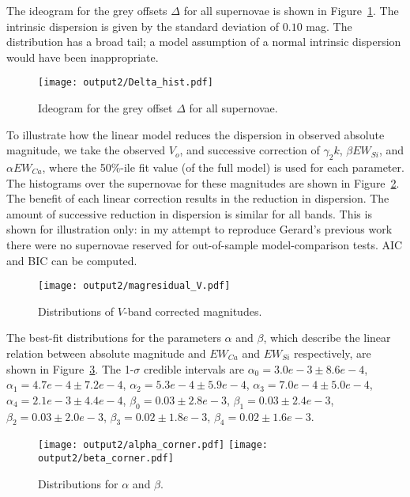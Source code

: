 \documentclass[11pt, oneside]{article}   	%
\begin{document}
The ideogram for the grey offsets $\Delta$ for all supernovae is shown in Figure~\ref{Delta_hist:fig}.  The intrinsic dispersion
is given by the standard deviation of $0.10$ mag.  The distribution has a broad tail; a model assumption of a normal intrinsic dispersion
would have been inappropriate.
\begin{figure}[htbp] %
   \centering
   \texttt{[image: output2/Delta\_hist.pdf]} 
   \caption{Ideogram for the grey offset $\Delta$ for all supernovae.}
   \label{Delta_hist:fig}
\end{figure}


To illustrate how the linear model reduces the dispersion in observed absolute magnitude, we take the
observed $V_o$, and successive correction of $\gamma_2k$,  $\beta EW_{Si}$, and  $\alpha EW_{Ca}$, 
where the 50\%-ile fit value (of the full model) is used for each parameter.  The histograms over the supernovae for these magnitudes are shown in
Figure~\ref{magresidual:fig}.  The benefit of each  linear correction results in the reduction in dispersion.  The amount
of successive reduction in dispersion is similar for all bands.  This is shown for illustration only: in my attempt to reproduce Gerard's previous
work there were no supernovae reserved for out-of-sample model-comparison tests.  AIC and BIC can be computed.
\begin{figure}[htbp] %
   \centering
   \texttt{[image: output2/magresidual\_V.pdf]} 
   \caption{Distributions of $V$-band corrected magnitudes.}
   \label{magresidual:fig}
\end{figure}

The best-fit distributions for the parameters $\alpha$ and $\beta$, which describe the linear relation between absolute magnitude
and $EW_{Ca}$ and $EW_{Si}$ respectively, are shown in Figure~\ref{alphabeta:fig}.  The 1-$\sigma$ 
credible intervals are $\alpha_0=3.0e-3 \pm 8.6e-4$,
$\alpha_1 = 4.7e-4  \pm 7.2e-4$, $\alpha_2 = 5.3e-4  \pm 5.9e-4$, $\alpha_3 = 7.0e-4  \pm 5.0e-4$,
$\alpha_4 = 2.1e-3  \pm 4.4e-4$,  $\beta_0=0.03  \pm 2.8e-3$,
$\beta_1 =0.03  \pm 2.4e-3$, $\beta_2 = 0.03  \pm 2.0e-3$, $\beta_3 =0.02  \pm 1.8e-3$,
$\beta_4 =0.02  \pm 1.6e-3$.
\begin{figure}[htbp] %
   \centering
   \texttt{[image: output2/alpha\_corner.pdf]} 
   \texttt{[image: output2/beta\_corner.pdf]} 
   \caption{Distributions for $\alpha$ and $\beta$.}
   \label{alphabeta:fig}
\end{figure}
\end{document}

